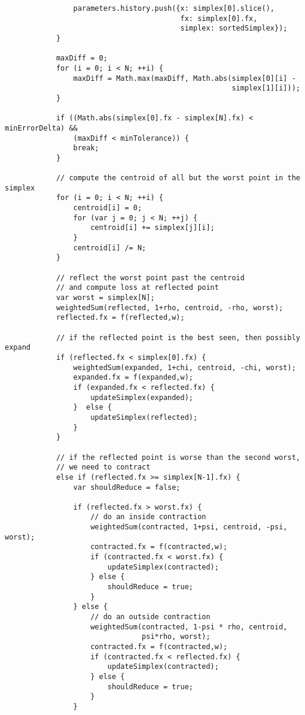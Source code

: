 \documentclass[11pt]{article}
\begin{document}
\begin{lstlisting}
                parameters.history.push({x: simplex[0].slice(),
                                         fx: simplex[0].fx,
                                         simplex: sortedSimplex});
            }

            maxDiff = 0;
            for (i = 0; i < N; ++i) {
                maxDiff = Math.max(maxDiff, Math.abs(simplex[0][i] -
                                                     simplex[1][i]));
            }

            if ((Math.abs(simplex[0].fx - simplex[N].fx) < minErrorDelta) &&
                (maxDiff < minTolerance)) {
                break;
            }

            // compute the centroid of all but the worst point in the simplex
            for (i = 0; i < N; ++i) {
                centroid[i] = 0;
                for (var j = 0; j < N; ++j) {
                    centroid[i] += simplex[j][i];
                }
                centroid[i] /= N;
            }

            // reflect the worst point past the centroid
            // and compute loss at reflected point
            var worst = simplex[N];
            weightedSum(reflected, 1+rho, centroid, -rho, worst);
            reflected.fx = f(reflected,w);

            // if the reflected point is the best seen, then possibly expand
            if (reflected.fx < simplex[0].fx) {
                weightedSum(expanded, 1+chi, centroid, -chi, worst);
                expanded.fx = f(expanded,w);
                if (expanded.fx < reflected.fx) {
                    updateSimplex(expanded);
                }  else {
                    updateSimplex(reflected);
                }
            }

            // if the reflected point is worse than the second worst,
            // we need to contract
            else if (reflected.fx >= simplex[N-1].fx) {
                var shouldReduce = false;

                if (reflected.fx > worst.fx) {
                    // do an inside contraction
                    weightedSum(contracted, 1+psi, centroid, -psi, worst);
                    contracted.fx = f(contracted,w);
                    if (contracted.fx < worst.fx) {
                        updateSimplex(contracted);
                    } else {
                        shouldReduce = true;
                    }
                } else {
                    // do an outside contraction
                    weightedSum(contracted, 1-psi * rho, centroid,
                                psi*rho, worst);
                    contracted.fx = f(contracted,w);
                    if (contracted.fx < reflected.fx) {
                        updateSimplex(contracted);
                    } else {
                        shouldReduce = true;
                    }
                }


\end{lstlisting}
\end{document}
